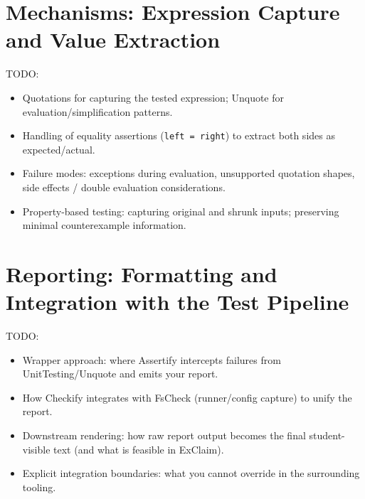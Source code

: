 \documentclass[
	bibliography=totoc,
	listof=totoc,
]{scrbook}
\begin{document}
\section{Mechanisms: Expression Capture and Value Extraction}

\begin{marker}\begin{justify}
TODO:
\begin{itemize}
    \item Quotations for capturing the tested expression; Unquote for evaluation/simplification patterns.
    \item Handling of equality assertions (\texttt{left = right}) to extract both sides as expected/actual.
    \item Failure modes: exceptions during evaluation, unsupported quotation shapes, side effects / double evaluation considerations.
    \item Property-based testing: capturing original and shrunk inputs; preserving minimal counterexample information.
\end{itemize}
\end{justify}\end{marker}


\section{Reporting: Formatting and Integration with the Test Pipeline}

\begin{marker}\begin{justify}
TODO:
\begin{itemize}
    \item Wrapper approach: where Assertify intercepts failures from UnitTesting/Unquote and emits your report.
    \item How Checkify integrates with FsCheck (runner/config capture) to unify the report.
    \item Downstream rendering: how raw report output becomes the final student-visible text (and what is feasible in ExClaim).
    \item Explicit integration boundaries: what you cannot override in the surrounding tooling.
\end{itemize}
\end{justify}\end{marker}
\end{document}
